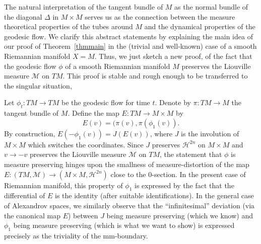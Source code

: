 \documentclass[12pt,leqno,intlimits]{amsart}
\numberwithin{equation}{section}
\theoremstyle{definition}
\theoremstyle{remark}
\newcommand{\tref}[1]{Theorem~\ref{#1}}
\def\:{\colon}
\begin{document}
The natural interpretation of the tangent bundle of $M$ as the normal  bundle of the diagonal $\Delta$ in $M\times M$ serves us as the connection between
the measure theoretical properties of the tubes around $M$ and the dynamical properties of the geodesic flow.
We clarify this abstract statements by explaining the main idea of  our  proof of \tref{thmmain} in the (trivial and well-known) case of a smooth Riemannian manifold $X=M$.
Thus, we just sketch a new proof,  of the fact   that the geodesic flow $\phi$ of a smooth Riemannian manifold $M$ preserves the Liouville measure $\mathcal M$ on $TM$.
This proof is stable and rough enough to be transferred to the singular situation,

Let  $\phi_t\: TM\to TM$ be the geodesic flow for time $t$.
Denote by $\pi\: TM\to M$ the tangent bundle of $M$. Define the map $E\:TM\to M\times M$  by
\[E(v)=(\pi(v), \pi (\phi _1 (v)).\]
By construction, $E(-\phi_1(v))= J(E(v))$,
where $J$ is the involution of $M\times M$ which switches the coordinates.
Since $J$ preserves $\mathcal H^{2n}$ on $M\times M$ and $v\to -v$ preserves the Liouville measure $\mathcal M$ on $TM$,
the statement that $\phi$ is measure preserving hinges upon the smallness of measure-distortion of the map $E \:(TM,\mathcal M) \to (M\times M, \mathcal H^{2n})$ close to the $0$-section.
In the present case of Riemannian manifold,
this property of $\phi_1$ is expressed by  the fact that the differential of $E$ is the identity (after suitable identifications).
In the general case of Alexandrov spaces, we similarly observe that the ``infinitesimal'' deviation (via the canonical map $E$) between $J$ being measure preserving (which we know) and  $\phi _1$ being measure preserving (which is what we want to show)
is expressed precisely as the triviality of  the mm-boundary.






\end{document}
